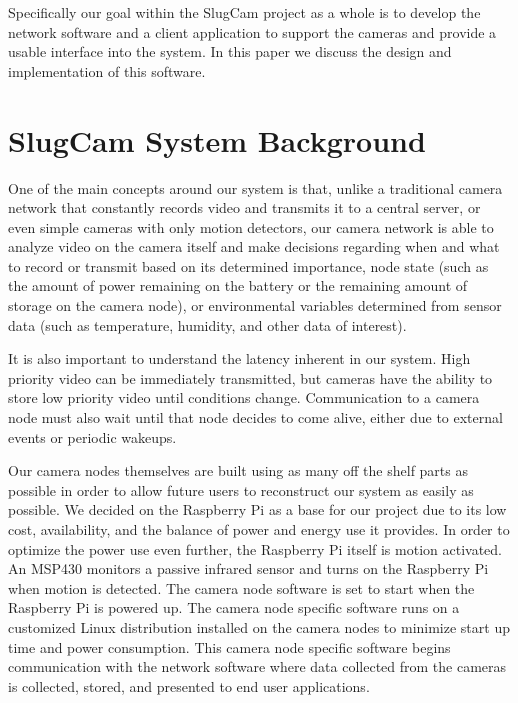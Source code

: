Specifically our goal within the SlugCam project as a whole is to develop the
network software and a client application to support the cameras and provide a
usable interface into the system. In this paper we discuss the design and
implementation of this software.

\section{SlugCam System Background}

One of the main concepts around our system is that, unlike a traditional camera
network that constantly records video and transmits it to a central server, or
even simple cameras with only motion detectors, our camera network is able to
analyze video on the camera itself and make decisions regarding when and what to
record or transmit based on its determined importance, node state (such as the
amount of power remaining on the battery or the remaining amount of
storage on the camera node), or environmental variables determined from sensor
data (such as temperature, humidity, and other data of interest).

It is also important to understand the latency inherent in our system. High
priority video can be immediately transmitted, but cameras have the ability to
store low priority video until conditions change. Communication to a camera
node must also wait until that node decides to come alive, either due to
external events or periodic wakeups.

Our camera nodes themselves are built using as many off the shelf parts as
possible in order to allow future users to reconstruct our system as easily as
possible. We decided on the Raspberry Pi\cite{raspi_home} as a base for our
project due to its low cost, availability, and the balance of power and energy
use it provides. In order to optimize the power use even further, the Raspberry
Pi itself is motion activated. An MSP430 monitors a passive infrared sensor and
turns on the Raspberry Pi when motion is detected. The camera node software is
set to start when the Raspberry Pi is powered up. The camera node specific
software runs on a customized Linux distribution installed on the camera nodes
to minimize start up time and power consumption. This camera node specific
software begins communication with the network software where data collected
from the cameras is collected, stored, and presented to end user applications.

